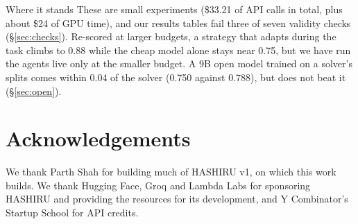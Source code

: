 \documentclass[11pt]{article}
\newcommand{\sys}{HASHIRU}
\newcommand{\sectionbreak}{\Needspace*{14\baselineskip}}  %
\begin{document}
\begin{keybox}{Where it stands}
These are small experiments (\$33.21 of API calls in total, plus about \$24 of GPU time), and our results tables fail
three of seven validity checks (\S\ref{sec:checks}). Re-scored at larger budgets, a strategy that adapts during the task
climbs to 0.88 while the cheap model alone stays near 0.75, but we have run the agents live only at the smaller budget.
A 9B open model trained on a solver's splits comes within 0.04 of the solver (0.750 against 0.788), but does not beat
it (\S\ref{sec:open}).
\end{keybox}

{\renewcommand{\sectionbreak}{}\renewcommand{\contentsname}{Contents}\tableofcontents}
\clearpage









\section*{Acknowledgements}
We thank Parth Shah for building much of \sys{} v1, on which this work builds. We thank Hugging Face, Groq and Lambda
Labs for sponsoring \sys{} and providing the resources for its development, and
Y Combinator's Startup School for API credits.

\renewcommand{\refname}{References}
{\small

}
\end{document}
